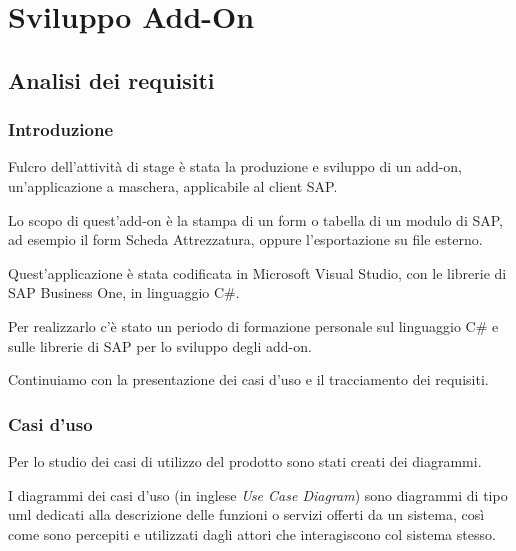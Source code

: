 
\chapter{Sviluppo Add-On}
\label{cap:sviluppo-addon}



\section{Analisi dei requisiti}
\subsection{Introduzione}


	\item Fulcro dell'attività di stage è stata la produzione e sviluppo di un add-on, un'applicazione a maschera, applicabile al client SAP.
	
	Lo scopo di quest'add-on è la stampa di un form o tabella di un modulo di SAP, ad esempio il form Scheda Attrezzatura, oppure l'esportazione su file esterno.
	\item Quest'applicazione è stata codificata in Microsoft Visual Studio, con le librerie di SAP Business One, in linguaggio C\#.
	
	Per realizzarlo c'è stato un periodo di formazione personale sul linguaggio C\# e sulle librerie di SAP per lo sviluppo degli add-on.

\vspace{1em}


Continuiamo con la presentazione dei casi d'uso e il tracciamento dei requisiti.
\newpage

\subsection{Casi d'uso}

	Per lo studio dei casi di utilizzo del prodotto sono stati creati dei diagrammi.
	
	I diagrammi dei casi d'uso (in inglese \emph{Use Case Diagram}) sono diagrammi di tipo \gls{uml} dedicati alla descrizione delle funzioni o servizi offerti da un sistema, così come sono percepiti e utilizzati dagli attori che interagiscono col sistema stesso.



